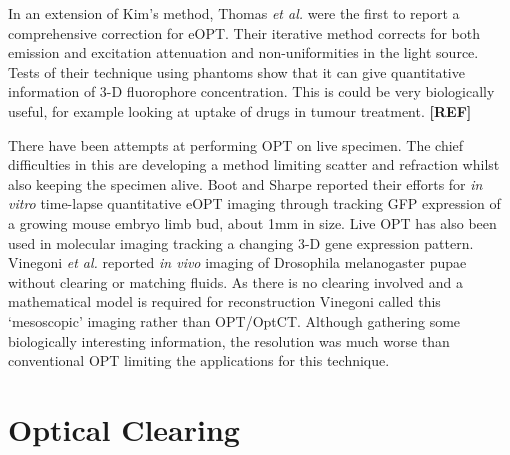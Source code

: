 \documentclass[12pt]{article}
\begin{document}
In an extension of Kim's method, Thomas \textit{et al.} were the first to report a comprehensive correction for  eOPT.\cite{Thomas:2010gt} Their iterative method corrects for both emission and excitation attenuation and non-uniformities in the light source. 
Tests of their technique using phantoms show that it can give quantitative information of 3-D fluorophore concentration. This is could be very biologically useful, for example looking at uptake of drugs in tumour treatment. \textbf{[REF]}

  




There have been attempts at performing OPT  on live specimen. \cite{Boot:2008dt, Vinegoni:2008ix, Colas:2009} The chief difficulties in this are developing a method limiting scatter and refraction  whilst also keeping the specimen alive. Boot and Sharpe reported their efforts for \textit{in vitro} time-lapse quantitative eOPT  imaging through tracking GFP expression of a growing mouse embryo limb bud, about 1mm in size. \cite{Boot:2008dt} 
Live OPT has also been used in molecular imaging tracking a changing 3-D gene expression pattern. \cite{Colas:2009}
Vinegoni \textit{et al.} reported \textit{in vivo} imaging of Drosophila melanogaster pupae without clearing or matching fluids. \cite{Vinegoni:2008ix}  As there is no clearing involved and a mathematical model is required for reconstruction Vinegoni called this `mesoscopic' imaging rather than OPT/OptCT.  
Although gathering some biologically interesting information, the resolution was much worse than conventional OPT limiting the applications for this technique. 










\newpage
\section{Optical Clearing}
\label{sec:clearing}
\end{document}
